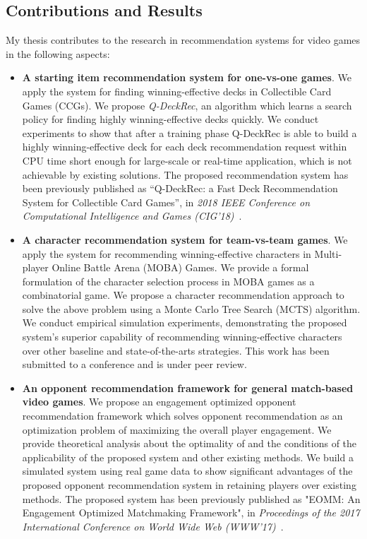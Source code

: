 \subsection{Contributions and Results}
My thesis contributes to the research in recommendation systems for video games in the following aspects:
\begin{itemize}
\item \textbf{A starting item recommendation system for one-vs-one games}. We apply the system for finding  winning-effective decks in Collectible Card Games (CCGs). We propose \textit{Q-DeckRec}, an algorithm which learns a
search policy for finding highly winning-effective decks quickly. We conduct experiments to show that after a training phase Q-DeckRec is
able to build a highly winning-effective deck for each deck recommendation request within CPU time short enough for large-scale or real-time application, which is not achievable by existing solutions. The proposed recommendation system has been previously published as ``Q-DeckRec: a Fast Deck Recommendation System for Collectible Card Games'', in \textit{2018 IEEE Conference on Computational Intelligence and Games (CIG'18)}~\cite{chenqdeckrec}.
\item \textbf{A character recommendation system for team-vs-team games}. We apply the system for recommending winning-effective characters in Multi-player Online Battle Arena (MOBA) Games. We provide a formal formulation of the character selection process in MOBA games as a combinatorial game. We propose a character recommendation approach to solve the above problem using a Monte Carlo Tree Search (MCTS) algorithm. We conduct empirical simulation experiments, demonstrating the proposed system's superior capability of recommending winning-effective characters over other baseline and state-of-the-arts strategies. This work has been submitted to a conference and is under peer review.
\item \textbf{An opponent recommendation framework for general match-based video games}. We
propose an engagement optimized opponent recommendation framework which solves opponent recommendation as an optimization problem of maximizing the overall player engagement. We provide theoretical analysis about the optimality of and the conditions of the applicability of the proposed system and other existing methods. We build a simulated system using real game data to show significant advantages of the proposed opponent recommendation system in retaining players over existing methods. The proposed system has been previously published as "EOMM: An Engagement Optimized Matchmaking Framework", in \textit{Proceedings of the 2017 International Conference on World Wide Web (WWW'17)}~\cite{chen2017eomm}.
\end{itemize}



